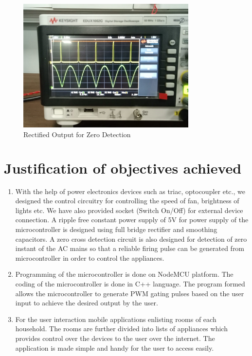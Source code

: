         \begin{figure}[H]
        	\centering
        	\includegraphics[width=0.8\textwidth]{photos/results/RectifiedOutputVoltage.jpg}
        	\caption{Rectified Output for Zero Detection}
        \end{figure}
    \newpage
        \section{Justification of objectives achieved}
         \begin{enumerate}
	         \item With the help of power electronics devices such as triac, optocoupler etc., we designed the control circuitry for controlling the speed of fan, brightness of lights etc. We have also provided socket (Switch On/Off) for external device connection. A ripple free constant power supply of 5V for power supply of the microcontroller is designed using full bridge rectifier and smoothing capacitors. A zero cross detection circuit is also designed for detection of zero instant of the AC mains so that a reliable firing pulse can be generated from microcontroller in order to control the appliances.
			\item Programming of the microcontroller is done on NodeMCU platform. The coding of the microcontroller is done in C++ language. The program formed allows the microcontroller to generate PWM gating pulses based on the user input to achieve the desired output by the user.
			\item For the user interaction mobile applications enlisting rooms of each household. The rooms are further divided into lists of appliances which provides control over the devices to the user over the internet. The application is made simple and handy for the user to access easily.
         \end{enumerate}
   